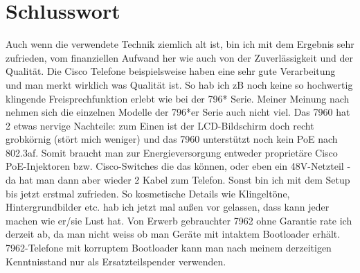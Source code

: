 \documentclass[a4paper,12pt]{scrbook}
\begin{document}
\chapter{Schlusswort}
Auch wenn die verwendete Technik ziemlich alt ist, bin ich mit dem Ergebnis sehr zufrieden, vom finanziellen Aufwand her wie auch von der Zuverlässigkeit und der Qualität. 
Die Cisco Telefone beispielsweise haben eine sehr gute Verarbeitung und man merkt wirklich
was Qualität ist. So hab ich zB noch keine so hochwertig klingende Freisprechfunktion erlebt wie bei der 796* Serie. Meiner Meinung nach nehmen sich die einzelnen Modelle der 796*er Serie auch nicht viel.
Das 7960 hat 2 etwas nervige Nachteile: zum Einen ist der LCD-Bildschirm doch recht grobkörnig (stört mich weniger) und das 7960 unterstützt noch kein PoE nach 802.3af. Somit braucht
man zur Energieversorgung entweder proprietäre Cisco PoE-Injektoren bzw. Cisco-Switches die das können, oder eben ein 48V-Netzteil - da hat man dann aber wieder 2 Kabel zum Telefon.
Sonst bin ich mit dem Setup bis jetzt erstmal zufrieden. So kosmetische Details wie Klingeltöne, Hintergrundbilder etc. hab ich jetzt mal außen vor gelassen, dass kann jeder machen wie er/sie 
Lust hat. Von Erwerb gebrauchter 7962 ohne Garantie rate ich derzeit ab, da man nicht weiss ob man Geräte mit intaktem Bootloader erhält. 7962-Telefone mit korruptem Bootloader kann man nach meinem
derzeitigen Kenntnisstand nur als Ersatzteilspender verwenden. 
\end{document}
